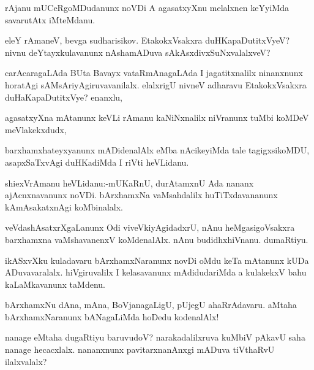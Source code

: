 \documentclass{article}
\begin{document}
\begin{mn}%
rAjanu mUCeRgoMDudanunx noVDi A agasatxyXnu melalxnen keYyiMda savarutAtx iMteMdanu.
\end{mn}

\begin{mn}%
eleY rAmaneV, bevga sudharisikov. EtakokxVsakxra duHKapaDutitxVyeV? nivnu 
deYtayxkulavanunx nAshamADuva sAkAsxdivxSuNxvalalxveV?
\end{mn}

\begin{mn}%
carAcaragaLAda BUta Bavayx vataRmAnagaLAda I jagatitxnalilx ninanxnunx horatAgi 
sAMsAriyAgiruvavanilalx. elalxrigU nivneV adharavu EtakokxVsakxra duHaKapaDutitxVye? enanxlu,
\end{mn}

\begin{mn}%
agasatxyXna mAtanunx keVLi rAmanu kaNiNxnalilx niVranunx tuMbi koMDeV meVlakekxdudx, 
\end{mn}

\begin{mn}%
barxhamxhateyxyanunx mADidenalAlx eMba nAcikeyiMda tale tagigxsikoMDU, asapxSaTxvAgi 
duHKadiMda I riVti heVLidanu.
\end{mn}

\begin{mn}%
shiexVrAmanu heVLidanu:-mUKaRnU, durAtamxnU Ada nananx ajAcnxnavanunx noVDi. bArxhamxNa 
vaMsahdalilx huTiTxdavananunx kAmAsakatxnAgi koMbinalalx.
\end{mn}

\begin{mn}%
veVdashAsatxrXgaLanunx Odi viveVkiyAgidadxrU, nAnu heMgasigoVsakxra barxhamxna 
vaMshavanenxV koMdenalAlx. nAnu budidhxhiVnanu. dumaRtiyu.
\end{mn}

\begin{mn}%
ikASxvXku kuladavaru bArxhamxNaranunx novDi oMdu keTa mAtanunx kUDa ADuvavaralalx. 
hiVgiruvalilx I kelasavanunx mAdidudariMda a kulakekxV bahu kaLaMkavanunx taMdenu.
\end{mn}

\begin{mn}%
bArxhamxNu dAna, mAna, BoVjanagaLigU, pUjegU ahaRrAdavaru. aMtaha bArxhamxNaranunx 
bANagaLiMda hoDedu kodenalAlx!
\end{mn}

\begin{mn}%
nanage eMtaha dugaRtiyu baruvudoV? narakadalilxruva kuMbiV pAkavU saha nanage hecacxlalx. 
nananxnunx pavitarxnanAnxgi mADuva tiVthaRvU ilalxvalalx?
\end{mn}
\end{document}
